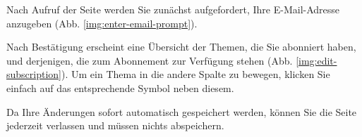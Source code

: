 Nach Aufruf der Seite werden Sie zunächst aufgefordert,
Ihre E-Mail-Adresse anzugeben (Abb. \ref{img:enter-email-prompt}).


Nach Bestätigung erscheint eine Übersicht der Themen,
die Sie abonniert haben,
und derjenigen,
die zum Abonnement zur Verfügung stehen
(Abb. \ref{img:edit-subscription}).
Um ein Thema in die andere Spalte zu bewegen,
klicken Sie einfach auf das entsprechende Symbol neben diesem.

Da Ihre Änderungen sofort automatisch gespeichert werden,
können Sie die Seite jederzeit verlassen
und müssen nichts abspeichern.

